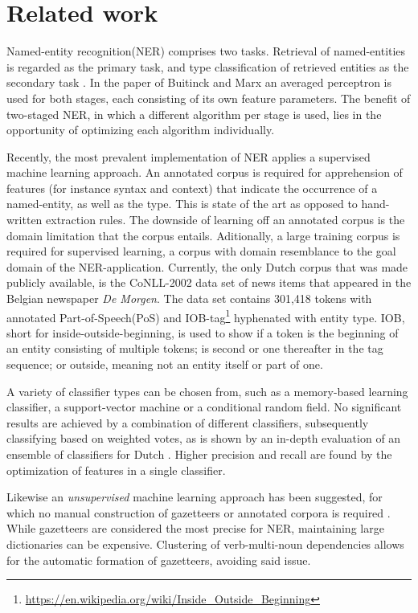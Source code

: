 \section{Related work} \label{sec:rel}
Named-entity recognition(NER) comprises two tasks. Retrieval of named-entities is regarded as the primary task, and type classification of retrieved entities as the secondary task \cite{buitinck2012two}. In the paper of Buitinck and Marx an averaged perceptron is used for both stages, each consisting of its own feature parameters. The benefit of two-staged NER, in which a different algorithm per stage is used, lies in the opportunity of optimizing each algorithm individually.  

Recently, the most prevalent implementation of NER applies a supervised machine learning approach. An annotated corpus is required for apprehension of features (for instance syntax and context) that indicate the occurrence of a named-entity, as well as the type. This is state of the art as opposed to hand-written extraction rules. The downside of learning off an annotated corpus is the domain limitation that the corpus entails. Aditionally, a large training corpus is required for supervised learning, a corpus with domain resemblance to the goal domain of the NER-application. Currently, the only Dutch corpus that was made publicly available, is the CoNLL-2002 data set of news items that appeared in the Belgian newspaper \textit{De Morgen}. The data set contains 301,418 tokens with annotated Part-of-Speech(PoS) and IOB-tag\footnote{\url{https://en.wikipedia.org/wiki/Inside_Outside_Beginning}} hyphenated with entity type. IOB, short for inside-outside-beginning, is used to show if a token is the beginning of an entity consisting of multiple tokens; is second or one thereafter in the tag sequence; or outside, meaning not an entity itself or part of one.

A variety of classifier types can be chosen from, such as a memory-based learning classifier, a support-vector machine or a conditional random field.
No significant results are achieved by a combination of different classifiers, subsequently classifying based on weighted votes, as is shown by an in-depth evaluation of an ensemble of classifiers for Dutch  \cite{desmet2014fine}. Higher precision and recall are found by the optimization of features in a single classifier. 

Likewise an \textit{unsupervised} machine learning approach has been suggested, for which no manual construction of gazetteers or annotated corpora is required \cite{kazama2008inducing}. While gazetteers are considered the most precise for NER, maintaining large dictionaries can be expensive. Clustering of verb-multi-noun dependencies allows for the automatic formation of gazetteers, avoiding said issue.

